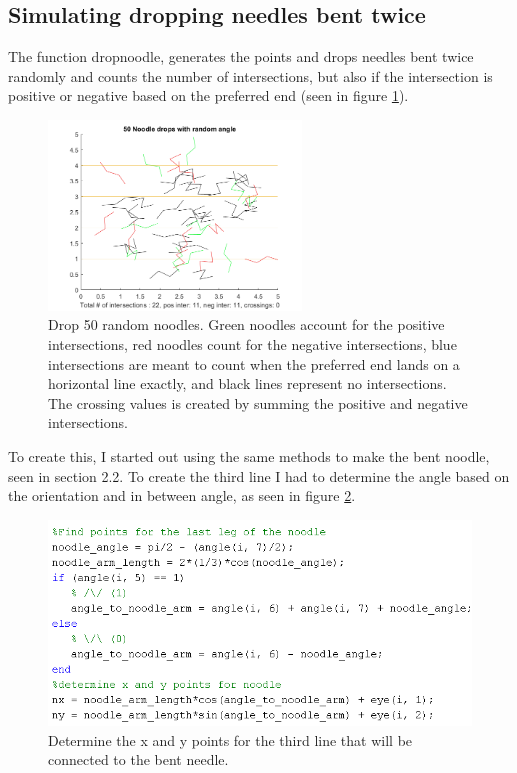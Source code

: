 \documentclass[11pt]{article}
\begin{document}

\subsection{Simulating dropping needles bent twice}
The function drop\underline{\hspace{0.2cm}}noodle, generates the points and drops needles bent twice randomly and counts the number of intersections, but also if the intersection is positive or negative based on the preferred end (seen in figure \ref{fig:d4}). 

\begin{figure}[H]
\begin{centering}
\includegraphics[width=0.6\textwidth]{noodle.png}
\end{centering}
\caption{Drop 50 random noodles. Green noodles account for the positive intersections, red noodles count for the negative intersections, blue intersections are meant to count when the preferred end lands on a horizontal line exactly, and black lines represent no intersections. The crossing values is created by summing the positive and negative intersections.}
\label{fig:d4}
\end{figure}

To create this, I started out using the same methods to make the bent noodle, seen in section 2.2. To create the third line I had to determine the angle based on the orientation and in between angle, as seen in figure \ref{fig:C8}.
\begin{figure}[H]
\begin{centering}
\includegraphics[scale=0.5]{f8.png}
\end{centering}
\caption{Determine the x and y points for the third line that will be connected to the bent needle.}
\label{fig:C8}
\end{figure}
\end{document}
